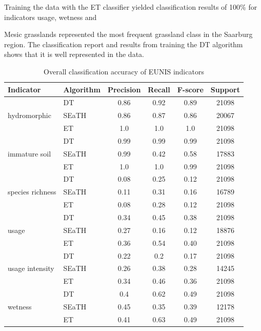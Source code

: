 \documentclass[authoryear, review,12pt,number]{elsarticle}
\begin{document}
{Training the data with the ET classifier yielded classification results of
100\% for indicators usage, wetness and

Mesic grasslands represented the most frequent grassland class in the Saarburg 
region. The classification report and results from training the DT algorithm  
shows that it is well represented in the data.

\begin{table}
    \centering
    \begin{tabular}{l l c c c c}
    Indicator & Algorithm & Precision & Recall & F-score & 
Support\\
    \hline
    \multirow{3}{*}{hydromorphic}
    & DT & 0.86 & 0.92 & 0.89 & 21098\\
    & SEaTH & 0.86 & 0.87 & 0.86 & 20067\\
    & ET & 1.0 & 1.0 & 1.0 & 21098\\
    \cline{2-6}
    \multirow{3}{*}{immature soil}
    & DT & 0.99 & 0.99 & 0.99 & 21098\\
    & SEaTH & 0.99 & 0.42 & 0.58 & 17883\\
    & ET & 1.0 & 1.0 & 0.99 & 21098\\
    \multirow{3}{*}{species richness}
    & DT & 0.08 & 0.25 & 0.12 & 21098\\
    & SEaTH & 0.11 & 0.31 & 0.16 & 16789\\
    & ET & 0.08 & 0.28 & 0.12 & 21098\\
    \cline{2-6}
    \multirow{3}{*}{usage}
    & DT & 0.34 & 0.45 & 0.38 & 21098\\
    & SEaTH & 0.27 & 0.16 & 0.12 & 18876\\
    & ET & 0.36 & 0.54 & 0.40 & 21098\\
    \cline{2-6}
    \multirow{3}{*}{usage intensity}
    & DT & 0.22 & 0.2 & 0.17 & 21098\\
    & SEaTH & 0.26 & 0.38 & 0.28 & 14245\\
    & ET & 0.34 & 0.46 & 0.36 & 21098\\
    \cline{2-6}
    \multirow{3}{*}{wetness}
    & DT & 0.4 & 0.62 & 0.49 & 21098\\
    & SEaTH & 0.45 & 0.35 & 0.39 & 12178\\
    & ET & 0.41 & 0.63 & 0.49 & 21098\\
    \end{tabular}
    \label{tab:classification_EUNIS}
    \caption{Overall classification accuracy of EUNIS indicators}
\end{table}

}
\end{document}
